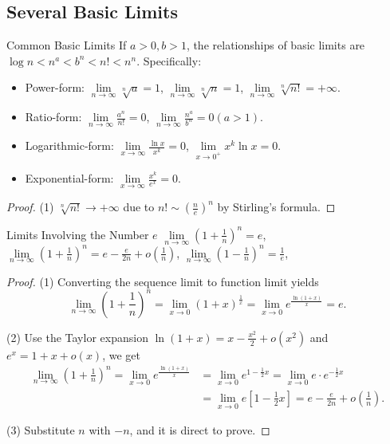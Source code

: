 \subsection{Several Basic Limits}

\begin{proposition}{Common Basic Limits}{}
  If $a > 0, b > 1$, the relationships of basic limits are
  $\log n < n^a < b^n < n! < n^n$. Specifically:
  \begin{itemize}
  \item Power-form: $\lim \limits _{n \rightarrow \infty} \sqrt[n]{a} = 1$,
    $\lim \limits _{n \rightarrow \infty} \sqrt[n]{n} = 1$,
    $\lim \limits _{n \rightarrow \infty} \sqrt[n]{n!} = +\infty$.
  \item Ratio-form: $\lim \limits _{n \rightarrow \infty} \frac{a^n}{n!} = 0$,
    $\lim \limits _{n \rightarrow \infty} \frac{n^a}{b^n} = 0 (a > 1)$.
  \item Logarithmic-form: $\lim \limits _{x \rightarrow \infty} \frac{\ln
      x}{x^k} = 0$,
    $\lim \limits _{x \rightarrow 0^+} x^k \ln x = 0$.
  \item Exponential-form: $\lim \limits _{x \rightarrow \infty} \frac{x^k}{e^x}
    = 0$.
  \end{itemize}
\end{proposition}

\begin{proof}
  (1) $\sqrt[n]{n!} \rightarrow +\infty$ due to $n! \sim \left( \frac{n}{e}
  \right)^n$ by Stirling's formula.
\end{proof}

\begin{proposition}{Limits Involving the Number $e$}{}
  $\lim \limits _{n \rightarrow \infty} \left(1 + \frac{1}{n}\right)^n = e$,
  $\lim \limits _{n \rightarrow \infty} (1 + \frac{1}{n})^n = e - \frac{e}{2n} +
  o(\frac{1}{n})$,
  $\lim \limits _{n \rightarrow \infty} \left( 1 - \frac{1}{n} \right)^n = \frac{1}{e}$,
\end{proposition}

\begin{proof}
  (1) Converting the sequence limit to function limit yields
  \begin{equation}
    \lim \limits _{n \rightarrow \infty} \left( 1 + \frac{1}{n} \right)^n
    = \lim \limits _{x \rightarrow 0} (1 + x)^{\frac{1}{x}}
    = \lim \limits _{x \rightarrow 0} e^{\frac{\ln (1 + x)}{x}} = e.
  \end{equation}

  (2) Use the Taylor expansion $\ln (1 + x) = x - \frac{x^2}{2} + o(x^2)$ and
  $e^x = 1 + x + o(x)$, we get
  \begin{align}
    \lim \limits _{n \rightarrow \infty} \left( 1 + \frac{1}{n} \right)^n
    = \lim \limits _{x \rightarrow 0} e^{\frac{\ln (1 + x)}{x}}
    &= \lim \limits _{x \rightarrow 0} e^{1 - \frac{1}{2}x}
    = \lim \limits _{x \rightarrow 0} e \cdot e^{-\frac{1}{2}x}\\
    &= \lim \limits _{x \rightarrow 0} e[1 - \frac{1}{2}x] = e - \frac{e}{2n} + o(\frac{1}{n}).
  \end{align}

  (3) Substitute $n$ with $-n$, and it is direct to prove.
\end{proof}

